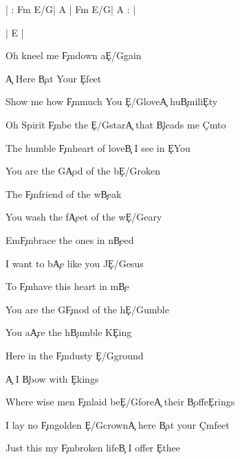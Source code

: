 \documentclass[9pt]{extarticle}
\begin{document}
\bsong

\bi
| : F\s m E/G\s   | A |  F\s m E/G\s   | A : |

| E |
\ei

\bv
Oh kneel me \c{F\s m}down a\c{E/G\s }gain

\c{A} Here \c{B}at Your \c{E}feet

Show me how \c{F\s m}much You \c{E/G\s }love\c{A} hu\c{B}mili\c{E}ty

Oh Spirit \c{F\s m}be the \c{E/G\s }star\c{A} that \c{B}leads me \c{C\s m}to

The humble \c{F\s m}heart of love\c{B} I see in \c{E}You
\ev

\bc
You are the G\c{A}od of the b\c{E/G\s }roken

The \c{F\s m}friend of the w\c{B}eak

You wash the f\c{A}eet of the w\c{E/G\s }eary

Em\c{F\s m}brace the ones in n\c{B}eed



I want to b\c{A}e like you J\c{E/G\s }esus

To \c{F\s m}have this heart in m\c{B}e

You are the G\c{F\s m}od of the h\c{E/G\s }umble

You a\c{A}re the h\c{B}umble K\c{E}ing
\ec

\bv
Here in the \c{F\s m}dusty \c{E/G\s }ground

\c{A} I \c{B}bow with \c{E}kings

Where wise men \c{F\s m}laid be\c{E/G\s }fore\c{A} their \c{B}offe\c{E}rings

I lay no \c{F\s m}golden \c{E/G\s }crown\c{A} here \c{B}at your \c{C\s m}feet

Just this my \c{F\s m}broken life\c{B} I offer \c{E}thee
\ev


\esong
\end{document}
